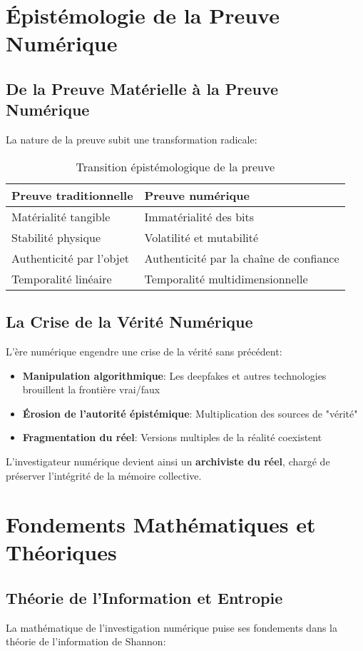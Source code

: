 \section{Épistémologie de la Preuve Numérique}
\subsection{De la Preuve Matérielle à la Preuve Numérique}
La nature de la preuve subit une transformation radicale:

\begin{table}[H]
\centering
\begin{tabular}{p{6cm}p{6cm}}
\hline
\textbf{Preuve traditionnelle} & \textbf{Preuve numérique} \\
\hline
Matérialité tangible & Immatérialité des bits \\
Stabilité physique & Volatilité et mutabilité \\
Authenticité par l'objet & Authenticité par la chaîne de confiance \\
Temporalité linéaire & Temporalité multidimensionnelle \\
\hline
\end{tabular}
\caption{Transition épistémologique de la preuve}
\end{table}

\subsection{La Crise de la Vérité Numérique}
L'ère numérique engendre une crise de la vérité sans précédent:
\begin{itemize}
\item \textbf{Manipulation algorithmique}: Les deepfakes et autres technologies brouillent la frontière vrai/faux
\item \textbf{Érosion de l'autorité épistémique}: Multiplication des sources de "vérité"
\item \textbf{Fragmentation du réel}: Versions multiples de la réalité coexistent
\end{itemize}

L'investigateur numérique devient ainsi un \textbf{archiviste du réel}, chargé de préserver l'intégrité de la mémoire collective.

\section{Fondements Mathématiques et Théoriques}
\subsection{Théorie de l'Information et Entropie}
La mathématique de l'investigation numérique puise ses fondements dans la théorie de l'information de Shannon:

